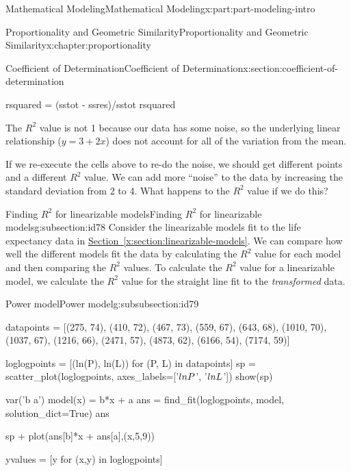 \documentclass[oneside,10pt,]{book}
\newcommand{\xreffont}{\relax}
\numberwithin{equation}{section}
\begin{document}
\begin{partptx}{Mathematical Modeling}{}{Mathematical Modeling}{}{}{x:part:part-modeling-intro}
\begin{chapterptx}{Proportionality and Geometric Similarity}{}{Proportionality and Geometric Similarity}{}{}{x:chapter:proportionality}
\begin{sectionptx}{Coefficient of Determination}{}{Coefficient of Determination}{}{}{x:section:coefficient-of-determination}
\begin{sageinput}
rsquared = (sstot - ssres)/sstot
rsquared
\end{sageinput}
The \(R^2\) value is not 1 because our data has some noise, so the underlying linear relationship (\(y=3+2x\)) does not account for all of the variation from the mean.%
\par
If we re-execute the cells above to re-do the noise, we should get different points and a different \(R^2\) value. We can add more ``noise'' to the data by increasing the standard deviation from 2 to 4.  What happens to the \(R^2\) value if we do this?%
%
%
\typeout{************************************************}
\typeout{************************************************}
%
\begin{subsectionptx}{Finding \(R^2\) for linearizable models}{}{Finding \(R^2\) for linearizable models}{}{}{g:subsection:id78}
Consider the linearizable models fit to the life expectancy data in \hyperref[x:section:linearizable-models]{Section~{\xreffont\ref{x:section:linearizable-models}}}. We can compare how well the different models fit the data by calculating the \(R^2\) value for each model and then comparing the \(R^2\) values. To calculate the \(R^2\) value for a linearizable model, we calculate the \(R^2\) value for the straight line fit to the \emph{transformed} data.%
%
%
\typeout{************************************************}
\typeout{************************************************}
%
\begin{subsubsectionptx}{Power model}{}{Power model}{}{}{g:subsubsection:id79}
\leavevmode%
\begin{sageinput}
datapoints = [(275, 74), (410, 72), (467, 73), (559, 67), (643, 68), (1010, 70), (1037, 67), (1216, 66), (2471, 57), (4873, 62), (6166, 54), (7174, 59)]

loglogpoints = [(ln(P), ln(L)) for (P, L) in datapoints]
sp = scatter_plot(loglogpoints, axes_labels=['$\\ln P$', '$\\ln L$'])
show(sp)
\end{sageinput}
\begin{sageinput}
var('b a')
model(x) = b*x + a
ans = find_fit(loglogpoints, model, solution_dict=True)
ans
\end{sageinput}
\begin{sageinput}
sp + plot(ans[b]*x + ans[a],(x,5,9))
\end{sageinput}
\begin{sageinput}
yvalues = [y for (x,y) in loglogpoints]


\end{sageinput}
\end{subsubsectionptx}
\end{subsectionptx}
\end{sectionptx}
\end{chapterptx}
\end{partptx}
\end{document}
